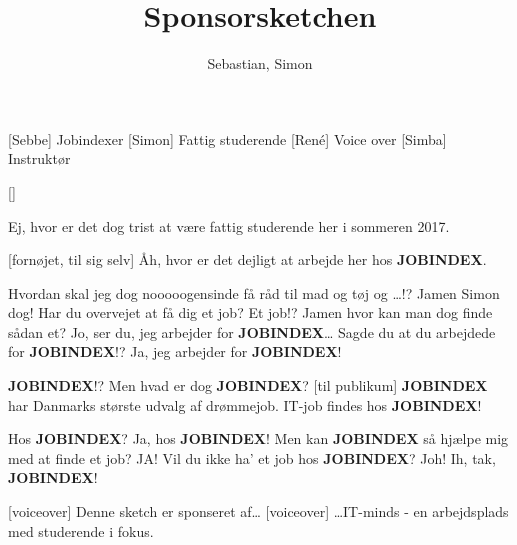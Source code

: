 \documentclass[a4paper,11pt]{article}
\title{Sponsorsketchen}
\author{Sebastian, Simon}
\begin{document}
\maketitle

\begin{roles}
    [Sebbe] Jobindexer
    [Simon] Fattig studerende
    [René] Voice over
    [Simba] Instruktør
\end{roles}

\begin{props}
    []
\end{props}

\newcommand{\jobindex}{\textbf{JOBINDEX}}

\begin{sketch}


 Ej, hvor er det dog trist at være fattig studerende her i sommeren 2017.


[fornøjet, til sig selv] Åh, hvor er det dejligt at arbejde her hos \jobindex.


 Hvordan skal jeg dog nooooogensinde få råd til mad og tøj og \ldots!?
 Jamen Simon dog! Har du overvejet at få dig et job?
 Et job!? Jamen hvor kan man dog finde sådan et?
 Jo, ser du, jeg arbejder for \jobindex\ldots
{} Sagde du at du arbejdede for \jobindex!?
 Ja, jeg arbejder for \jobindex!

 \jobindex!? Men hvad er dog \jobindex?
[til publikum] \jobindex{} har Danmarks største udvalg af drømmejob. IT-job findes hos \jobindex!

 Hos \jobindex?
 Ja, hos \jobindex!
 Men kan \jobindex{} så hjælpe mig med at finde et job?
 JA! Vil du ikke ha' et job hos \jobindex?
 Joh! Ih, tak, \jobindex!


[voiceover] Denne sketch er sponseret af\ldots
{}
[voiceover] \ldots IT-minds - en arbejdsplads med studerende i fokus.

\end{sketch}
\end{document}
